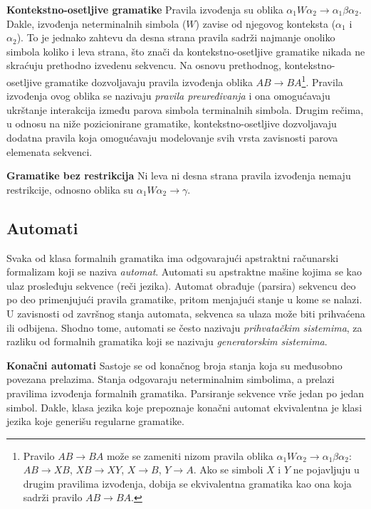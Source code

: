\documentclass[a4paper, 12pt]{article}
\begin{document}
\vspace*{0.2cm}
\noindent \textbf{Kontekstno-osetljive gramatike} \hspace{0.3cm} Pravila izvođenja su oblika $\alpha_1 W \alpha_2 \rightarrow \alpha_1 \beta \alpha_2$. Dakle, izvođenja neterminalnih simbola ($W$) zavise od njegovog konteksta ($\alpha_1$ i $\alpha_2$). To je jednako zahtevu da desna strana pravila sadrži najmanje onoliko simbola koliko i leva strana, što znači da kontekstno-osetljive gramatike nikada ne skraćuju prethodno izvedenu sekvencu. Na osnovu prethodnog, kontekstno-osetljive gramatike dozvoljavaju pravila izvođenja oblika $AB \rightarrow BA$\footnote{Pravilo $AB \rightarrow BA$ može se zameniti nizom pravila oblika $\alpha_1 W \alpha_2 \rightarrow \alpha_1 \beta \alpha_2$: $AB \rightarrow XB$, $XB \rightarrow XY$, $X \rightarrow B$, $Y \rightarrow A$. Ako se simboli $X$ i $Y$ ne pojavljuju u drugim pravilima izvođenja, dobija se ekvivalentna gramatika kao ona koja sadrži pravilo $AB \rightarrow BA$.}. Pravila izvođenja ovog oblika se nazivaju \textit{pravila preuređivanja} i ona omogućavaju ukrštanje interakcija između parova simbola terminalnih simbola. Drugim rečima, u odnosu na niže pozicionirane gramatike, kontekstno-osetljive dozvoljavaju dodatna pravila koja omogućavaju modelovanje svih vrsta zavisnosti parova elemenata sekvenci.

\vspace*{0.2cm}
\noindent \textbf{Gramatike bez restrikcija} \hspace{0.3cm} Ni leva ni desna strana pravila izvođenja nemaju restrikcije, odnosno oblika su $\alpha_1 W  \alpha_2 \rightarrow \gamma$. 

\subsection{Automati}

Svaka od klasa formalnih gramatika ima odgovarajući apstraktni računarski formalizam koji se naziva \textit{automat}. Automati su apstraktne mašine kojima se kao ulaz prosleđuju sekvence (reči jezika). Automat obrađuje (parsira) sekvencu deo po deo primenjujući pravila gramatike, pritom menjajući stanje u kome se nalazi. U zavisnosti od završnog stanja automata, sekvenca sa ulaza može biti prihvaćena ili odbijena. Shodno tome, automati se često nazivaju \textit{prihvatačkim sistemima}, za razliku od formalnih gramatika koji se nazivaju \textit{generatorskim sistemima}. 

\noindent \textbf{Konačni automati} \hspace{0.3cm} Sastoje se od konačnog broja stanja koja su međusobno povezana prelazima. Stanja odgovaraju neterminalnim simbolima, a prelazi pravilima izvođenja formalnih gramatika. Parsiranje sekvence vrše jedan po jedan simbol. Dakle, klasa jezika koje prepoznaje konačni automat ekvivalentna je klasi jezika koje generišu regularne gramatike.
\end{document}

